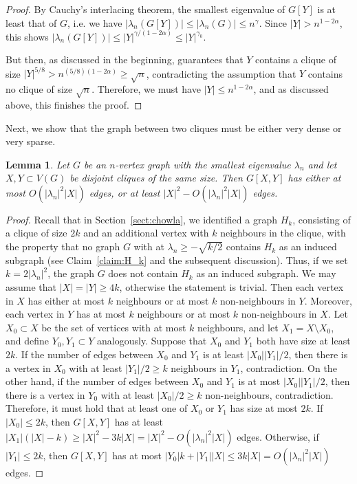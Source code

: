 \documentclass[11pt]{article}
\theoremstyle{plain}
\newtheorem{lemma}[theorem]{Lemma}
\theoremstyle{definition}
\begin{document}
\begin{proof}
By Cauchy's interlacing theorem, the smallest eigenvalue of $G[Y]$ is at least that of $G$, i.e. we have $|\lambda_n(G[Y])|\leq |\lambda_n(G)|\leq n^\gamma$. 
Since $|Y|> n^{1-2\alpha}$, this shows $|\lambda_n(G[Y])|\leq |Y|^{\gamma/(1-2\alpha)}\le |Y|^{\gamma_0}$.

But then, as discussed in the beginning,  guarantees that $Y$ contains a clique of size $|Y|^{5/8}>n^{(5/8)(1-2\alpha)}\geq \sqrt{n}$, contradicting the assumption that $Y$ contains no clique of size $\sqrt{n}$.
Therefore, we must have $|Y|\leq n^{1-2\alpha}$, and as discussed above, this finishes the proof.
\end{proof}

Next, we show that the graph between two cliques must be either very dense or very sparse. 

\begin{lemma}\label{lemma:bipartite_eigenvalue}
Let $G$ be an $n$-vertex graph with the smallest eigenvalue $\lambda_n$ and let $X,Y\subset V(G)$ be disjoint cliques of the same size. Then $G[X,Y]$ has either at most $O(|\lambda_n|^2 |X|)$ edges, or at least $|X|^2-O(|\lambda_n|^2 |X|)$ edges.
\end{lemma}
\begin{proof}
Recall that in Section~\ref{sect:chowla}, we identified a graph $H_k$, consisting of a clique of size $2k$ and an additional vertex with $k$ neighbours in the clique, with the property that no graph $G$ with at $\lambda_n\geq -\sqrt{k/2}$ contains $H_k$ as an induced subgraph (see Claim~\ref{claim:H_k} and the subsequent discussion). Thus, if we set $k=2|\lambda_n|^2$, the graph $G$ does not contain $H_k$ as an induced subgraph. 
We may assume that $|X|=|Y|\geq 4k$, otherwise the statement is trivial.
Then each vertex in $X$ has either at most $k$ neighbours or at most $k$ non-neighbours in $Y$. 
Moreover, each vertex in $Y$ has at most $k$ neighbours or at most $k$ non-neighbours in $X$.  
Let $X_0\subset X$ be the set of vertices with at most $k$ neighbours, and let $X_1=X\setminus X_0$, and define $Y_0,Y_1\subset Y$ analogously. 
Suppose that $X_0$ and $Y_1$ both have size at least $2k$. 
If the number of edges between $X_0$ and $Y_1$ is at least $|X_0||Y_1|/2$, then there is a vertex in $X_0$ with at least $|Y_1|/2\geq k$ neighbours in $Y_1$, contradiction. 
On the other hand, if the number of edges between $X_0$ and $Y_1$ is at most $|X_0||Y_1|/2$, then there is a vertex in $Y_0$ with at least $|X_0|/2\geq k$ non-neighbours, contradiction. 
Therefore, it must hold that at least one of $X_0$ or $Y_1$ has size at most $2k$.
If $|X_0|\leq 2k$, then $G[X,Y]$ has at least $|X_1|(|X|-k)\geq |X|^2-3k|X|=|X|^2-O(|\lambda_n|^2|X|)$ edges. 
Otherwise, if $|Y_1|\leq 2k$, then $G[X,Y]$ has at most $|Y_0|k+|Y_1||X|\leq 3k |X|=O(|\lambda_n|^2|X|)$ edges. 
\end{proof}
\end{document}
